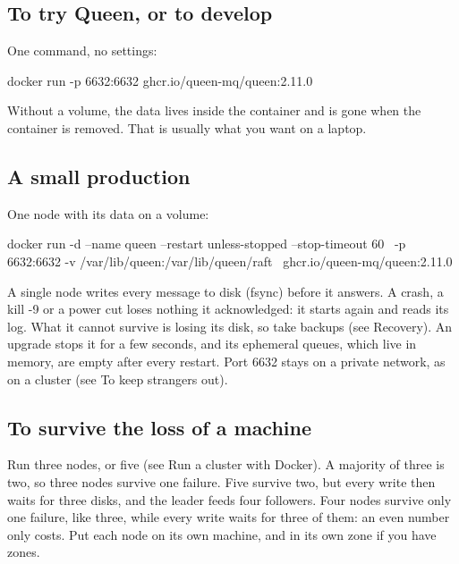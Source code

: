 \subsection{To try Queen, or to develop}

One command, no settings:

\begin{shell}
docker run -p 6632:6632 ghcr.io/queen-mq/queen:2.11.0
\end{shell}

Without a volume, the data lives inside the container and is gone when the container is removed.
That is usually what you want on a laptop.

\subsection{A small production}

One node with its data on a volume:

\begin{shell}
docker run -d --name queen --restart unless-stopped --stop-timeout 60 \
  -p 6632:6632 -v /var/lib/queen:/var/lib/queen/raft \
  ghcr.io/queen-mq/queen:2.11.0
\end{shell}

A single node writes every message to disk (fsync) before it answers. A crash, a kill -9 or a
power cut loses nothing it acknowledged: it starts again and reads its log. What it cannot survive
is losing its disk, so take backups (see Recovery). An upgrade stops it for a few seconds, and its
ephemeral queues, which live in memory, are empty after every restart. Port 6632 stays on a private
network, as on a cluster (see To keep strangers out).


\subsection{To survive the loss of a machine}

Run three nodes, or five (see Run a cluster with Docker). A majority of three is two, so three
nodes survive one failure. Five survive two, but every write then waits for three disks, and the
leader feeds four followers. Four nodes survive only one failure, like three, while every write
waits for three of them: an even number only costs. Put each node on its own machine, and in its
own zone if you have zones.

